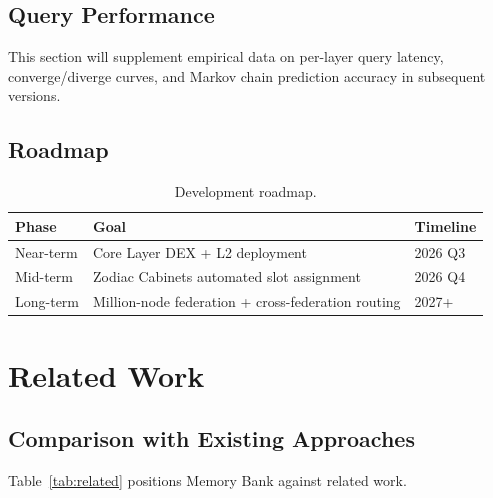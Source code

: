 \documentclass[11pt,a4paper]{article}
\begin{document}
\subsection{Query Performance}
\label{sub:performance}

This section will supplement empirical data on per-layer query latency, converge/diverge curves, and Markov chain prediction accuracy in subsequent versions.

\subsection{Roadmap}
\label{sub:roadmap}

\begin{table}[ht]
\centering
\caption{Development roadmap.}
\label{tab:roadmap}
\begin{tabular}{@{}lll@{}}
\toprule
\textbf{Phase} & \textbf{Goal} & \textbf{Timeline} \\
\midrule
Near-term & Core Layer DEX + L2 deployment            & 2026 Q3 \\
Mid-term  & Zodiac Cabinets automated slot assignment & 2026 Q4 \\
Long-term & Million-node federation + cross-federation routing & 2027+ \\
\bottomrule
\end{tabular}
\end{table}

\section{Related Work}
\label{sec:related}

\subsection{Comparison with Existing Approaches}
\label{sub:comparison}

Table~\ref{tab:related} positions Memory Bank against related work.
\end{document}
